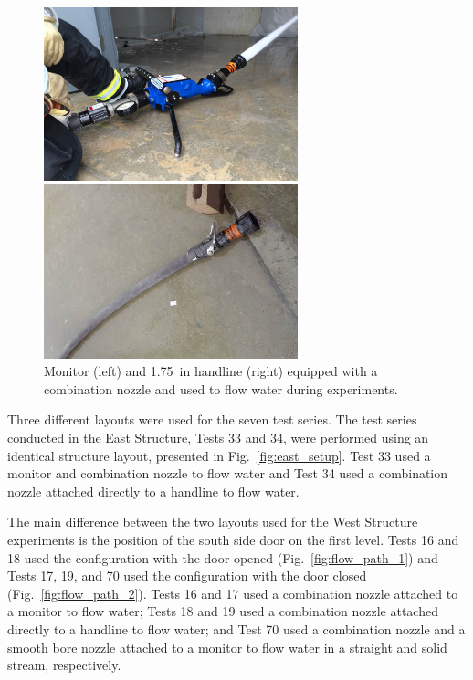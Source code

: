 \documentclass[12pt,oneside]{book}
\begin{document}
\begin{figure}[!ht]
	\minipage{3in}
	\begin{center}
		\includegraphics[width=2.9in]{../Figures/Pictures/monitor}
	\end{center} 
	\endminipage \hfill
	\minipage{3in}
	\begin{center}
		\includegraphics[width=2.9in]{../Figures/Pictures/handline}
	\end{center}
	\endminipage \hfill
	\caption[Monitor and handline equipped with a combination nozzle.]{Monitor (left) and 1.75~in handline (right) equipped with a combination nozzle and used to flow water during experiments.}
	\label{fig:monitor+handline}
\end{figure}
\FloatBarrier

Three different layouts were used for the seven test series. The test series conducted in the East Structure, Tests 33 and 34, were performed using an identical structure layout, presented in Fig.~\ref{fig:east_setup}. Test 33 used a monitor and combination nozzle to flow water and Test 34 used a combination nozzle attached directly to a handline to flow water.

The main difference between the two layouts used for the West Structure experiments is the position of the south side door on the first level. Tests 16 and 18 used the configuration with the door opened (Fig.~\ref{fig:flow_path_1}) and Tests 17, 19, and 70 used the configuration with the door closed (Fig.~\ref{fig:flow_path_2}). Tests 16 and 17 used a combination nozzle attached to a monitor to flow water; Tests 18 and 19 used a combination nozzle attached directly to a handline to flow water; and Test 70 used a combination nozzle and a smooth bore nozzle attached to a monitor to flow water in a straight and solid stream, respectively. 
\end{document}
